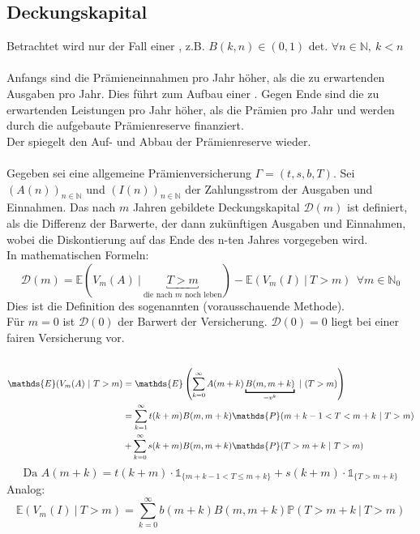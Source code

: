 \subsection{Deckungskapital}
\label{sub:deckungskapital}
Betrachtet wird nur der Fall einer , z.B. $B(k,n) \in (0,1)$ det. $\forall n \in \mathds{N},~k<n$\\
\\
Anfangs sind die Prämieneinnahmen pro Jahr höher, als die zu erwartenden Ausgaben pro Jahr. 
Dies führt zum Aufbau einer . 
Gegen Ende sind die zu erwartenden Leistungen pro Jahr höher, als die Prämien pro Jahr und werden durch die aufgebaute Prämienreserve finanziert.\\
Der  spiegelt den Auf- und Abbau der Prämienreserve wieder.\\
\\
Gegeben sei eine allgemeine Prämienversicherung $\Gamma=(t,s,b,T)$.
Sei $(A(n))_{n\in \mathds{N}}$ und $(I(n))_{n\in \mathds{N}}$ der Zahlungsstrom der Ausgaben und Einnahmen. 
Das nach $m$ Jahren gebildete Deckungskapital $\mathcal{D}(m)$ ist definiert, als die Differenz der Barwerte, der dann zukünftigen Ausgaben und Einnahmen, wobei die Diskontierung auf das Ende des n-ten Jahres vorgegeben wird.\\
In mathematischen Formeln: 
\[
\mathcal{D}(m)= \mathds{E}(V_m(A)~|~\underbracket{T>m}_{\text{die nach $m$ noch leben}})- \mathds{E}(V_m(I)~|~T>m) ~~ \forall m\in \mathds{N}_0 
\]
Dies ist die Definition des sogenannten  (vorausschauende Methode).\\
Für $m=0$ ist $\mathcal{D}(0)$ der Barwert der Versicherung. 
$\mathcal{D}(0)=0$ liegt bei einer fairen Versicherung vor.\\
\\
\begin{equation*}
\begin{aligned}
	\mathds{E}(V_m(A)~|~T>m) &= \mathds{E}\enbrace{\sum_{k=0}^{\infty}A(m+k)\underbracket{B(m,m+k)}_{=v^k}~|~(T>m)}\\
	&= \sum_{k=1}^{\infty}t(k+m)B(m,m+k) \mathds{P}(m+k-1<T<m+k~|~T>m)\\
	&+ \sum_{k=0}^{\infty}s(k+m)B(m,m+k) \mathds{P}(T>m+k~|~T>m)	
\end{aligned}
\end{equation*}
\[
\text{Da } A(m+k) = t(k+m)\cdot \mathbb{1}_{\{m+k-1<T \le m+k \}} + s(k+m)\cdot \mathbb{1}_{\{T>m+k \}}
\]
Analog:
\[
\mathds{E}(V_m(I)~|~T>m)= \sum_{k=0}^{\infty}b(m+k)B(m,m+k) \mathds{P}(T>m+k~|~T>m) 
\]

